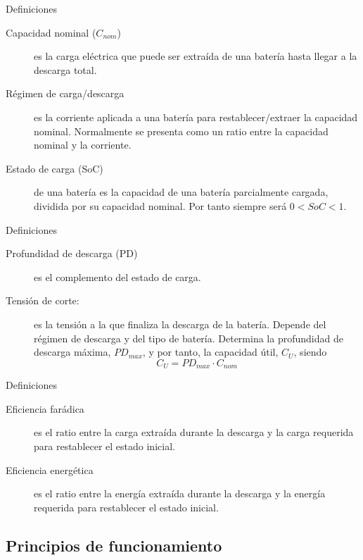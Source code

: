 \documentclass[xcolor={usenames,svgnames,dvipsnames}]{beamer}
\begin{document}
\begin{frame}[label=sec-2-1-2]{Definiciones}
\begin{description}
\item[{Capacidad nominal ($C_{nom}$)}] es la carga eléctrica que puede ser extraída de una batería hasta llegar a la descarga total.

\item[{Régimen de carga/descarga}] es la corriente aplicada a una batería para restablecer/extraer la capacidad nominal. Normalmente se presenta como un ratio entre la capacidad nominal y la corriente.

\item[{Estado de carga (SoC)}] de una batería es la capacidad de una batería parcialmente cargada, dividida por su capacidad nominal. Por tanto siempre será $0<SoC<1$.
\end{description}
\end{frame}

\begin{frame}[label=sec-2-1-3]{Definiciones}
\begin{description}
\item[{Profundidad de descarga (PD)}] es el complemento del estado de carga.

\item[{Tensión de corte:}] es la tensión a la que finaliza la descarga de la batería. Depende del régimen de descarga y del tipo de batería.  Determina la profundidad de descarga máxima, $PD_{max}$, y por tanto, la capacidad útil, $C_{U}$, siendo $$C_{U}=PD_{max}\cdot C_{nom}$$
\end{description}
\end{frame}

\begin{frame}[label=sec-2-1-4]{Definiciones}
\begin{description}
\item[{Eficiencia farádica}] es el ratio entre la carga extraída durante la descarga y la carga requerida para restablecer el estado inicial.

\item[{Eficiencia energética}] es el ratio entre la energía extraída durante la descarga y la energía requerida para restablecer el estado inicial.
\end{description}
\end{frame}

\subsection{Principios de funcionamiento}
\label{sec-2-2}
\end{document}
